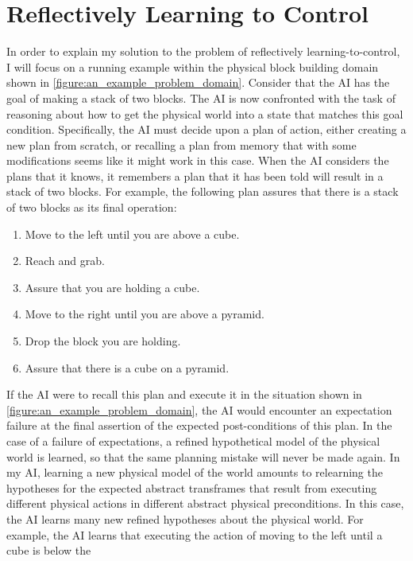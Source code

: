 \chapter{Reflectively Learning to Control}
\label{chapter:reflectively_learning_to_control}

In order to explain my solution to the problem of reflectively
learning-to-control, I will focus on a running example within the
physical block building domain shown in
\autoref{figure:an_example_problem_domain}.  Consider that the AI has
the goal of making a stack of two blocks.  The AI is now confronted
with the task of reasoning about how to get the physical world into a
state that matches this goal condition.  Specifically, the AI must
decide upon a plan of action, either creating a new plan from scratch,
or recalling a plan from memory that with some modifications seems
like it might work in this case.  When the AI considers the plans that
it knows, it remembers a plan that it has been told will result in a
stack of two blocks.  For example, the following plan assures that
there is a stack of two blocks as its final operation:
\begin{enumerate}
\item Move to the left until you are above a cube.
\item Reach and grab.
\item Assure that you are holding a cube.
\item Move to the right until you are above a pyramid.
\item Drop the block you are holding.
\item Assure that there is a cube on a pyramid.
\end{enumerate}
If the AI were to recall this plan and execute it in the situation
shown in \autoref{figure:an_example_problem_domain}, the AI would
encounter an expectation failure at the final assertion of the
expected post-conditions of this plan.  In the case of a failure of
expectations, a refined hypothetical model of the physical world is
learned, so that the same planning mistake will never be made again.
In my AI, learning a new physical model of the world amounts to
relearning the hypotheses for the expected abstract transframes that
result from executing different physical actions in different abstract
physical preconditions.  In this case, the AI learns many new refined
hypotheses about the physical world.  For example, the AI learns that
executing the action of moving to the left until a cube is below the
